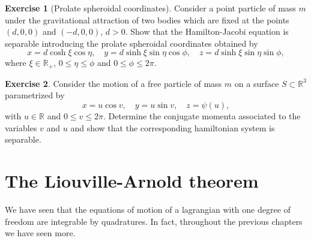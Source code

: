 \documentclass[english,fontsize=11pt,paper=b5]{scrbook}
\numberwithin{equation}{chapter}
\theoremstyle{definition}
\newtheorem{exercise}{Exercise}[chapter]
\begin{document}
      \begin{exercise}[Prolate spheroidal coordinates]
        Consider a point particle of mass $m$ under the gravitational attraction of two bodies which are fixed at the points $(d,0,0)$ and $(-d,0,0)$, $d>0$.
        Show that the Hamilton-Jacobi equation is separable introducing the prolate spheroidal coordinates obtained by
        \begin{equation}
          x = d \cosh\xi \cos\eta, \quad
          y = d \sinh\xi \sin\eta \cos\phi, \quad
          z = d \sinh\xi \sin\eta \sin\phi,
        \end{equation}
        where $\xi\in\mathbb{R}_+$, $0\leq\eta\leq\phi$ and $0\leq\phi\leq 2\pi$.
      \end{exercise}

      \begin{exercise}
        Consider the motion of a free particle of mass $m$ on a surface $S\subset\mathbb{R}^3$ parametrized by
        \begin{equation}
          x = u \cos v, \quad
          y = u \sin v, \quad
          z = \psi(u),
        \end{equation}
        with $u\in\mathbb{R}$ and $0\leq v\leq 2\pi$.
        Determine the conjugate momenta associated to the variables $v$ and $u$ and show that the corresponding hamiltonian system is separable.
      \end{exercise}

      \section{The Liouville-Arnold theorem}\label{sec:intsys}

      We have seen that the equations of motion of a lagrangian with one degree of freedom are integrable by quadratures.
      In fact, throughout the previous chapters we have seen more.
\end{document}
